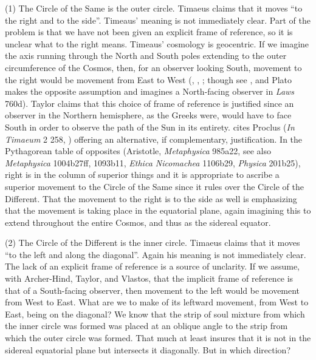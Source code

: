 (1) The Circle of the Same is the outer circle. Timaeus claims that it moves ``to the right and to the side''. Timeaus' meaning is not immediately clear. Part of the problem is that we have not been given an explicit frame of reference, so it is unclear what to the right means. Timeaus' cosmology is geocentric. If we imagine the axis running through the North and South poles extending to the outer circumference of the Cosmos, then, for an observer looking South, movement to the right would be movement from East to West (\citealt[112--3 n5]{Archer-Hind:1888qd}, \citealt[150]{Taylor:1928qb}, \citealt[34 n23]{Vlastos:1975aa}; though see \citealt[122]{Dicks:1970aa}, and Plato makes the opposite assumption and imagines a North-facing observer in \emph{Laws} 760d). Taylor claims that this choice of frame of reference is justified since an observer in the Northern hemisphere, as the Greeks were, would have to face South in order to observe the path of the Sun in its entirety. \citet[74]{Cornford:1935fk} cites Proclus (\emph{In Timaeum} 2 258, \citealt{Diehl:1903re}) offering an alternative, if complementary, justification. In the Pythagorean table of opposites (Aristotle, \emph{Metaphysica} 985a22, see also \emph{Metaphysica} 1004b27ff, 1093b11, \emph{Ethica Nicomachea} 1106b29, \emph{Physica} 201b25), right is in the column of superior things and it is appropriate to ascribe a superior movement to the Circle of the Same since it rules over the Circle of the Different. That the movement to the right is to the side as well is emphasizing that the movement is taking place in the equatorial plane, again imagining this to extend throughout the entire Cosmos, and thus as the sidereal equator. 

(2) The Circle of the Different is the inner circle. Timaeus claims that it moves ``to the left and along the diagonal''. Again his meaning is not immediately clear. The lack of an explicit frame of reference is a source of unclarity. If we assume, with Archer-Hind, Taylor, and Vlastos, that the implicit frame of reference is that of a South-facing observer, then movement to the left would be movement from West to East. What are we to make of its leftward movement, from West to East, being on the diagonal? We know that the strip of soul mixture from which the inner circle was formed was placed at an oblique angle to the strip from which the outer circle was formed. That much at least insures that it is not in the sidereal equatorial plane but intersects it diagonally. But in which direction?

